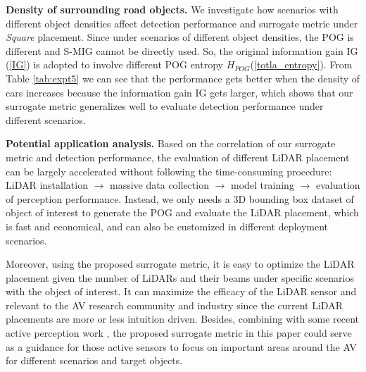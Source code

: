 \documentclass[10pt,twocolumn,letterpaper]{article}
\newcommand{\todo}[1]{\hl{[#1]}}
\begin{document}
\textbf{Density of surrounding road objects.}
We investigate how scenarios with different object densities affect detection performance and surrogate metric under \textit{Square} placement. Since under scenarios of different object densities, the POG is different and S-MIG cannot be directly used. So, the original information gain IG (\ref{IG}) is adopted to involve different POG entropy $H_{POG}$(\ref{totla_entropy}). From Table \ref{tab:expt5} we can see that the performance gets better when the density of cars increases because the information gain IG gets larger, which shows that our surrogate metric generalizes well to evaluate detection performance under different scenarios.






\textbf{Potential application analysis.}
Based on the correlation of our surrogate metric and detection performance, the evaluation of different LiDAR placement can be largely accelerated without following the time-consuming procedure: LiDAR installation $\rightarrow$ massive data collection $\rightarrow$ model training $\rightarrow$ evaluation of perception performance. Instead, we only needs a 3D bounding box dataset of object of interest to generate the POG and evaluate the LiDAR placement, which is fast and economical, and can also be customized in different deployment scenarios.


Moreover, using the proposed surrogate metric, it is easy to optimize the LiDAR placement given the number of LiDARs and their beams under specific scenarios with the object of interest.  It can maximize the efficacy of the LiDAR sensor and relevant to the AV research community and industry since the current LiDAR placements are more or less intuition driven.
Besides, combining with some recent active perception work  \cite{bartels2019agile,ancha2020active,raaj2021exploiting,ancha2021active}, the proposed surrogate metric in this paper could serve as a guidance for those active sensors to focus on important areas around the AV for different scenarios and target objects.
\end{document}
